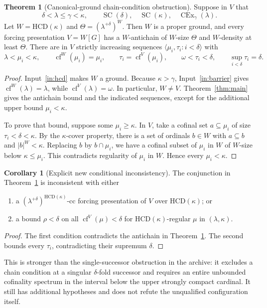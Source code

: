 \documentclass[11pt,letterpaper]{article}
\theoremstyle{definition}
\newtheorem{theorem}[definition]{Theorem}
\newtheorem{corollary}[definition]{Corollary}
\numberwithin{equation}{section}
\newcommand{\HCD}{\mathrm{HCD}}
\newcommand{\cf}{\operatorname{cf}}
\newcommand{\SC}{\operatorname{SC}}
\newcommand{\CEx}{\operatorname{CEx}}
\newcommand{\cc}{\text{-cc}}
\begin{document}
\begin{theorem}[Canonical-ground chain-condition obstruction]\label{thm:hcd}
Suppose in $V$ that
\[
\delta<\lambda\le\gamma<\kappa,
\qquad\SC(\delta),\quad\SC(\kappa),\quad\CEx_\gamma(\lambda).
\]
Let $W=\HCD(\kappa)$ and $\Theta=(\lambda^{+\delta})^W$. Then $W$ is a proper ground, and every forcing presentation $V=W[G]$ has a $W$-antichain of $W$-size $\Theta$ and $W$-density at least $\Theta$. There are in $V$ strictly increasing sequences $\langle\mu_i,\tau_i:i<\delta\rangle$ with
\[
\lambda<\mu_i<\kappa,\qquad
\cf^W(\mu_i)=\mu_i,\qquad
\tau_i=\cf^V(\mu_i),\qquad
\omega<\tau_i<\delta,
\qquad\sup_{i<\delta}\tau_i=\delta.
\]
\end{theorem}
\begin{proof}
Input~\ref{in:hcd} makes $W$ a ground. Because $\kappa>\gamma$, Input~\ref{in:barrier} gives $\cf^W(\lambda)=\lambda$, while $\cf^V(\lambda)=\omega$. In particular, $W\ne V$. Theorem~\ref{thm:main} gives the antichain bound and the indicated sequences, except for the additional upper bound $\mu_i<\kappa$.

To prove that bound, suppose some $\mu_i\ge\kappa$. In $V$, take a cofinal set $a\subseteq\mu_i$ of size $\tau_i<\delta<\kappa$. By the $\kappa$-cover property, there is a set of ordinals $b\in W$ with $a\subseteq b$ and $|b|^W<\kappa$. Replacing $b$ by $b\cap\mu_i$, we have a cofinal subset of $\mu_i$ in $W$ of $W$-size below $\kappa\le\mu_i$. This contradicts regularity of $\mu_i$ in $W$. Hence every $\mu_i<\kappa$.
\end{proof}

\begin{corollary}[Explicit new conditional inconsistency]\label{cor:hcdincon}
The conjunction in Theorem~\ref{thm:hcd} is inconsistent with either
\begin{enumerate}
\item a $(\lambda^{+\delta})^{\HCD(\kappa)}\cc$ forcing presentation of $V$ over $\HCD(\kappa)$; or
\item a bound $\rho<\delta$ on all $\cf^V(\mu)<\delta$ for $\HCD(\kappa)$-regular $\mu$ in $(\lambda,\kappa)$.
\end{enumerate}
\end{corollary}
\begin{proof}
The first condition contradicts the antichain in Theorem~\ref{thm:hcd}. The second bounds every $\tau_i$, contradicting their supremum $\delta$.
\end{proof}

This is stronger than the single-successor obstruction in the archive: it excludes a chain condition at a singular $\delta$-fold successor and requires an entire unbounded cofinality spectrum in the interval below the upper strongly compact cardinal. It still has additional hypotheses and does not refute the unqualified configuration itself.
\end{document}
